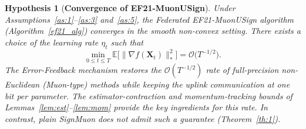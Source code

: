 \documentclass[letterpaper]{article} %
\newtheorem{hypothesis}{Hypothesis}
\begin{document}
\begin{hypothesis}[\textbf{Convergence of EF21-MuonUSign}]\label{hyp:1}
Under Assumptions~\ref{as:1}--\ref{as:3} and~\ref{as:5}, the Federated EF21-MuonUSign algorithm (Algorithm~\ref{ef21_alg}) converges in the smooth non-convex setting. There exists a choice of the learning rate $\eta_t$ such that
\begin{equation}
\min_{0 \le t \le T}\mathbb{E}\bigl[\|\nabla f(\mathbf{X}_t)\|_*^2\bigr]
= \mathcal{O}\bigl(T^{-1/2}\bigr).
\end{equation}
The Error-Feedback mechanism restores the $\mathcal{O}(T^{-1/2})$ rate of full-precision non-Euclidean (Muon-type) methods while keeping the uplink communication at one bit per parameter. The estimator-contraction and momentum-tracking bounds of Lemmas~\ref{lem:est}--\ref{lem:mom} provide the key ingredients for this rate. In contrast, plain SignMuon does not admit such a guarantee (Theorem~\ref{th:1}).
\end{hypothesis}
\end{document}
